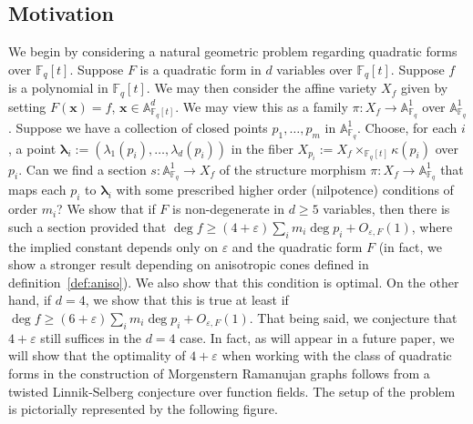 \documentclass[11pt]{amsart}
\theoremstyle{plain}
\theoremstyle{plain}
\renewcommand{\vec}[1]{\mathbf{#1}}
\theoremstyle{remark}
\theoremstyle{definition}
\begin{document}
\subsection{Motivation}
We begin by considering a natural geometric problem regarding quadratic forms over $\mathbb{F}_q[t]$. Suppose $F$ is a quadratic form in $d$ variables over $\mathbb{F}_q[t]$. Suppose $f$ is a polynomial in $\mathbb{F}_q[t]$. We may then consider the affine variety $X_f$ given by setting $F(\vec{x})=f$, $\vec{x}\in\mathbb{A}^d_{\mathbb{F}_q[t]}$. We may view this as a family $\pi:X_f\rightarrow\mathbb{A}^1_{\mathbb{F}_q}$ over $\mathbb{A}^1_{\mathbb{F}_q}$. Suppose we have a collection of closed points $p_1,\hdots,p_m$ in $\mathbb{A}^1_{\mathbb{F}_q}$. Choose, for each $i$, a point $\boldsymbol{\lambda}_i:=(\lambda_1(p_i),\hdots,\lambda_d(p_i))$ in the fiber $X_{p_i}:=X_f\times_{\mathbb{F}_q[t]}\kappa(p_i)$ over $p_i$.  Can we find a section $s:\mathbb{A}^1_{\mathbb{F}_q}\rightarrow X_f$ of the structure morphism $\pi:X_f\rightarrow\mathbb{A}^1_{\mathbb{F}_q}$ that maps each $p_i$ to $\boldsymbol{\lambda}_i$ with some prescribed higher order (nilpotence) conditions of order $m_i$? We show that if $F$ is non-degenerate in $d\geq 5$ variables, then there is such a section provided that $\deg f \geq (4+\varepsilon)\sum_{i}m_i\deg p_i +O_{\varepsilon,F}(1)$, where the implied constant depends only on $\varepsilon$ and the quadratic form $F$ (in fact, we show a stronger result depending on anisotropic cones defined in definition~\ref{def:aniso}). We also show that this condition is optimal. On the other hand, if $d=4$, we show that this is true at least if $\deg f\geq (6+\varepsilon)\sum_{i}m_i\deg p_i+O_{\varepsilon,F}(1)$. That being said, we conjecture that  $4+\varepsilon$ still suffices in the $d=4$ case. In fact, as will appear in a future paper, we will show that the optimality of $4+\varepsilon$ when working with the class of quadratic forms in the construction of Morgenstern Ramanujan graphs follows from a twisted Linnik-Selberg conjecture over function fields. The setup of the problem is pictorially represented by the following figure.
\end{document}
